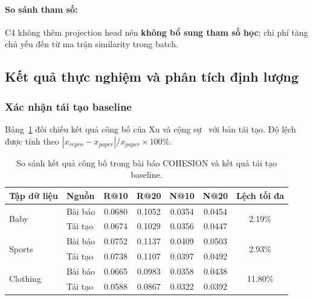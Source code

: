 \paragraph{So sánh tham số:}
C4 không thêm projection head nên \textbf{không bổ sung tham số học}; chi phí tăng chủ yếu đến từ ma trận similarity trong batch.


\subsection{Kết quả thực nghiệm và phân tích định lượng}

\subsubsection{Xác nhận tái tạo baseline}

Bảng~\ref{tab:cohesion_paper_vs_baseline} đối chiếu kết quả công bố của Xu và cộng sự~\cite{xu2025cohesion} với bản tái tạo. Độ lệch được tính theo $|x_{repro}-x_{paper}|/x_{paper}\times100\%$.

\begingroup
\fontsize{8.5}{10}\selectfont
\setlength{\tabcolsep}{3pt}
\renewcommand{\arraystretch}{1.15}
\begin{table}[H]
\centering
\caption{So sánh kết quả công bố trong bài báo COHESION và kết quả tái tạo baseline.}
\label{tab:cohesion_paper_vs_baseline}
\fontsize{8.5}{10}\selectfont
\begin{tabular}{l l *{4}{c} c}
\toprule
\rowcolor{gray!15}
\textbf{Tập dữ liệu} & \textbf{Nguồn} & \textbf{R@10} & \textbf{R@20} & \textbf{N@10} & \textbf{N@20} & \textbf{Lệch tối đa} \\
\midrule
\multirow{2}{*}{Baby}
 & Bài báo & 0.0680 & 0.1052 & 0.0354 & 0.0454 & \multirow{2}{*}{2.19\%} \\
 & Tái tạo & 0.0674 & 0.1029 & 0.0356 & 0.0447 & \\
\midrule
\multirow{2}{*}{Sports}
 & Bài báo & 0.0752 & 0.1137 & 0.0409 & 0.0503 & \multirow{2}{*}{2.93\%} \\
 & Tái tạo & 0.0738 & 0.1107 & 0.0397 & 0.0492 & \\
\midrule
\multirow{2}{*}{Clothing}
 & Bài báo & 0.0665 & 0.0983 & 0.0358 & 0.0438 & \multirow{2}{*}{11.80\%} \\
 & Tái tạo & 0.0588 & 0.0867 & 0.0322 & 0.0392 & \\
\bottomrule
\end{tabular}
\end{table}
\endgroup

